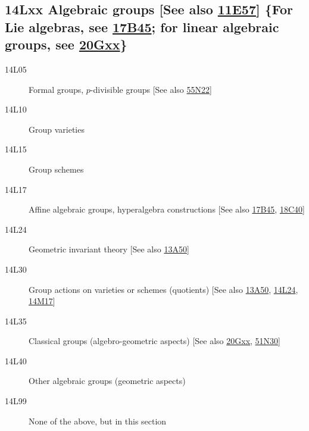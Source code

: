 \documentclass[letterpaper]{article}
\begin{document}
\subsection*{14Lxx Algebraic groups [See also \hyperref[11E57]{11E57}] \{For Lie algebras, see \hyperref[17B45]{17B45}; for linear algebraic groups, see \hyperref[20Gxx]{20Gxx}\} }\label{14Lxx}
\begin{description}               
\item [14L05]\label{14L05} Formal groups, $p$-divisible groups [See also \hyperref[55N22]{55N22}]
\item [14L10]\label{14L10} Group varieties
\item [14L15]\label{14L15} Group schemes
\item [14L17]\label{14L17} Affine algebraic groups, hyperalgebra constructions [See also \hyperref[17B45]{17B45}, \hyperref[18C40]{18C40}]
\item [14L24]\label{14L24} Geometric invariant theory [See also \hyperref[13A50]{13A50}]
\item [14L30]\label{14L30} Group actions on varieties or schemes (quotients) [See also \hyperref[13A50]{13A50}, \hyperref[14L24]{14L24}, \hyperref[14M17]{14M17}]
\item [14L35]\label{14L35} Classical groups (algebro-geometric aspects) [See also \hyperref[20Gxx]{20Gxx}, \hyperref[51N30]{51N30}]
\item [14L40]\label{14L40} Other algebraic groups (geometric aspects)
\item [14L99]\label{14L99} None of the above, but in this section
\end{description}          
\end{document}
